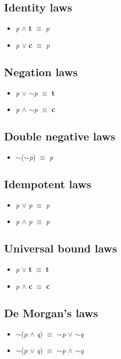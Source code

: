\documentclass{article}
\begin{document}
\subsection{Identity laws}
\begin{itemize}
\item \textit{p} $\wedge$ \textbf{t} $\equiv$ \textit{p}
\item \textit{p} $\lor$ \textbf{c} $\equiv$ \textit{p}
\end{itemize}

\subsection{Negation laws}
\begin{itemize}
\item \textit{p} $\lor$ $\sim$\textit{p} $\equiv$ \textbf{t}
\item \textit{p} $\wedge$ $\sim$\textit{p} $\equiv$ \textbf{c}
\end{itemize}

\subsection{Double negative laws}
\begin{itemize}
\item $\sim$($\sim$\textit{p}) $\equiv$ \textit{p}
\end{itemize}

\subsection{Idempotent laws}
\begin{itemize}
\item \textit{p} $\lor$ \textit{p} $\equiv$ \textit{p}
\item \textit{p} $\wedge$ \textit{p} $\equiv$ \textit{p}
\end{itemize}

\subsection{Universal bound laws}
\begin{itemize}
\item \textit{p} $\lor$ \textbf{t} $\equiv$ \textbf{t}
\item \textit{p} $\wedge$ \textbf{c} $\equiv$ \textbf{c}
\end{itemize}

\subsection{De Morgan's laws}
\begin{itemize}
\item $\sim$(\textit{p} $\wedge$ \textit{q}) $\equiv$ $\sim$\textit{p} $\lor$ $\sim$\textit{q}
\item $\sim$(\textit{p} $\lor$ \textit{q}) $\equiv$ $\sim$\textit{p} $\wedge$ $\sim$\textit{q}
\end{itemize}
\end{document}
